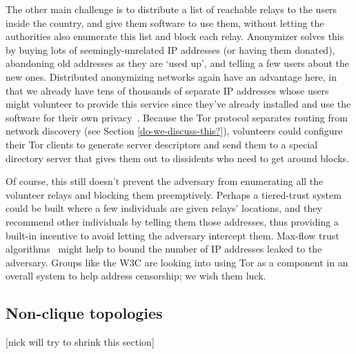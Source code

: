 \documentclass{llncs}
\begin{document}
The other main challenge is to distribute a list of reachable relays
to the users inside the country, and give them software to use them,
without letting the authorities also enumerate this list and block each
relay. Anonymizer solves this by buying lots of seemingly-unrelated IP
addresses (or having them donated), abandoning old addresses as they are
`used up', and telling a few users about the new ones. Distributed
anonymizing networks again have an advantage here, in that we already
have tens of thousands of separate IP addresses whose users might
volunteer to provide this service since they've already installed and use
the software for their own privacy~\cite{koepsell-wpes2004}. Because
the Tor protocol separates routing from network discovery (see Section
\ref{do-we-discuss-this?}), volunteers could configure their Tor clients
to generate server descriptors and send them to a special directory
server that gives them out to dissidents who need to get around blocks.

Of course, this still doesn't prevent the adversary
from enumerating all the volunteer relays and blocking them preemptively.
Perhaps a tiered-trust system could be built where a few individuals are
given relays' locations, and they recommend other individuals by telling them
those addresses, thus providing a built-in incentive to avoid letting the
adversary intercept them. Max-flow trust algorithms~\cite{advogato}
might help to bound the number of IP addresses leaked to the adversary. Groups
like the W3C are looking into using Tor as a component in an overall system to
help address censorship; we wish them luck.


\subsection{Non-clique topologies}

[nick will try to shrink this section]
\end{document}
